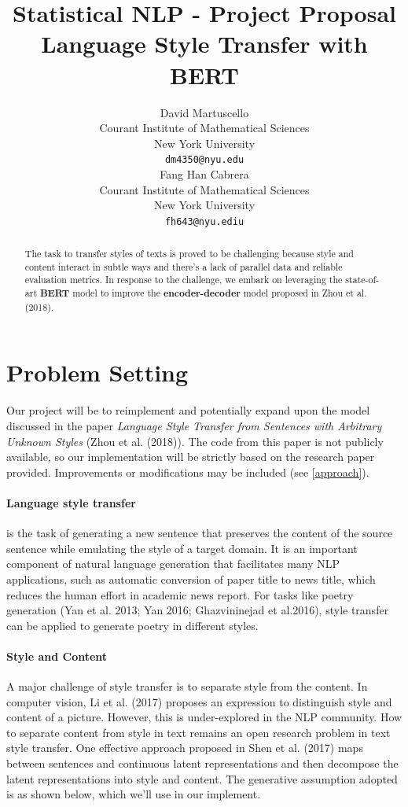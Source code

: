 \documentclass{article}
\title{Statistical NLP - Project Proposal \\
Language Style Transfer with BERT}
\author{%
  David Martuscello\\
  Courant Institute of Mathematical Sciences \\
  New York University\\
  \texttt{dm4350@nyu.edu} \\
  \And
  Fang Han Cabrera\\
  Courant Institute of Mathematical Sciences \\
  New York University \\
  \texttt{fh643@nyu.ediu} \\
}
\begin{document}
\maketitle

\begin{abstract}
The task to transfer styles of texts is proved to be challenging because style and content interact in subtle ways and there's a lack of parallel data and reliable evaluation metrics. In response to the challenge, we embark on leveraging the state-of-art \textbf{BERT} model to improve the \textbf{encoder-decoder} model proposed in Zhou et al. (2018).
\end{abstract}

\section{Problem Setting}

Our project will be to reimplement and potentially expand upon the model discussed in the paper \emph{Language Style Transfer from Sentences with Arbitrary Unknown Styles} (Zhou et al. (2018)). The code from this paper is not publicly available, so our implementation will be strictly based on the research paper provided. Improvements or modifications may be included (see \ref{approach}). 
\paragraph{Language style transfer} is the task of generating a new sentence that preserves the content of the source sentence while emulating the style of a target domain. It is an important component of natural language generation that facilitates many NLP applications, such as automatic conversion of paper title to news title, which reduces the human effort in academic news report. For tasks like poetry
generation (Yan et al. 2013; Yan 2016; Ghazvininejad et al.2016), style transfer can be applied to generate poetry in different styles. 

\paragraph{Style and Content} A major challenge of style transfer is to separate
style from the content. In computer vision, Li et al. (2017) proposes an expression to distinguish style and content of a picture. However, this is under-explored in the NLP community. How to separate content from style in text remains an open research problem in text style transfer. One effective approach proposed in Shen et al. (2017) maps between sentences and continuous latent representations and then decompose the latent representations into style and content. The generative assumption adopted is as shown below, which we'll use in our implement.
\end{document}
